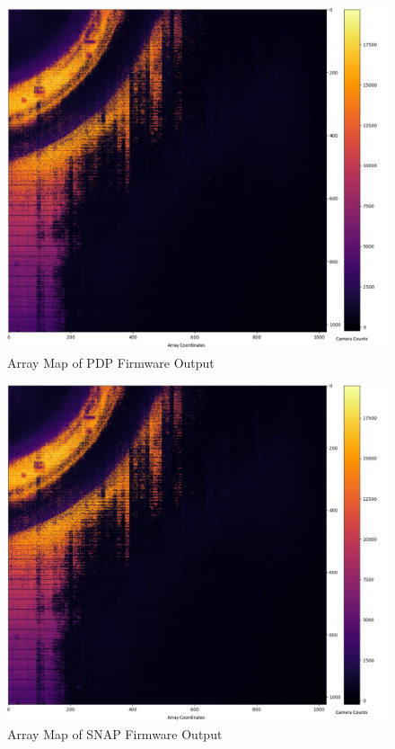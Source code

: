             \begin{figure}[t]
                \centering
                \includegraphics[width=1.0\textwidth]{fig/array_map_pdp.jpg}
                \caption{Array Map of PDP Firmware Output}
                \label{fig:array_map_pdp}
            \end{figure}

            \begin{figure}[t]
                \centering
                \includegraphics[width=1.0\textwidth]{fig/array_map_snap.jpg}
                \caption{Array Map of SNAP Firmware Output}
                \label{fig:array_map_snap}
            \end{figure}

